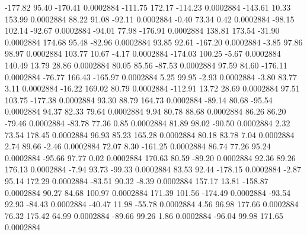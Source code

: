      -177.82       95.40     -170.41     0.0002884
     -111.75      172.17     -114.23     0.0002884
     -143.61       10.33      153.99     0.0002884
       88.22       91.08      -92.11     0.0002884
       -0.40       73.34        0.42     0.0002884
      -98.15      102.14      -92.67     0.0002884
      -94.01       77.98     -176.91     0.0002884
      138.81      173.54      -31.90     0.0002884
      174.68       95.48      -82.96     0.0002884
       93.85       92.61     -167.20     0.0002884
       -3.85       97.86       98.97     0.0002884
      103.77       10.67       -4.17     0.0002884
     -174.03      100.25       -5.67     0.0002884
      140.49       13.79       28.86     0.0002884
       80.05       85.56      -87.53     0.0002884
       97.59       84.60     -176.11     0.0002884
      -76.77      166.43     -165.97     0.0002884
        5.25       99.95       -2.93     0.0002884
       -3.80       83.77        3.11     0.0002884
      -16.22      169.02       80.79     0.0002884
     -112.91       13.72       28.69     0.0002884
       97.51      103.75     -177.38     0.0002884
       93.30       88.79      164.73     0.0002884
      -89.14       80.68      -95.54     0.0002884
       94.37       82.33       79.64     0.0002884
        9.94       80.78       88.68     0.0002884
       86.26       86.20      -79.46     0.0002884
      -83.78       77.36        0.85     0.0002884
       81.89       98.02      -90.50     0.0002884
        2.32       73.54      178.45     0.0002884
       96.93       85.23      165.28     0.0002884
       80.18       83.78        7.04     0.0002884
        2.74       89.66       -2.46     0.0002884
       72.07        8.30     -161.25     0.0002884
       86.74       77.26       95.24     0.0002884
      -95.66       97.77        0.02     0.0002884
      170.63       80.59      -89.20     0.0002884
       92.36       89.26      176.13     0.0002884
       -7.94       93.73      -99.33     0.0002884
       83.53       92.44     -178.15     0.0002884
       -2.87       95.14      172.29     0.0002884
      -83.51       90.32       -8.39     0.0002884
      157.17       13.81     -158.87     0.0002884
       90.27       84.68      100.97     0.0002884
      171.39      101.56     -174.49     0.0002884
      -93.54       92.93      -84.43     0.0002884
      -40.47       11.98      -55.78     0.0002884
        4.56       96.98      177.66     0.0002884
       76.32      175.42       64.99     0.0002884
      -89.66       99.26        1.86     0.0002884
      -96.04       99.98      171.65     0.0002884
